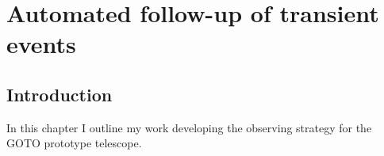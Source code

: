 \chapter{Automated follow-up of transient events}
\label{chap:followup}
\chaptoc{}


\newpage
\section{Introduction}
\label{sec:followup_intro}
\begin{colsection}


\begin{colsection}

In this chapter I outline my work developing the observing strategy for the GOTO prototype telescope.

\end{colsection}


\end{colsection}


\newpage

